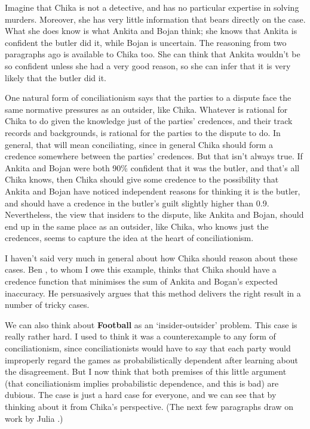 Imagine that \gls{Chika} is not a detective, and has no particular expertise in solving murders. Moreover, she has very little information that bears directly on the case. What she does know is what \gls{Ankita} and \gls{Bojan} think; she knows that \gls{Ankita} is confident the butler did it, while \gls{Bojan} is uncertain. The reasoning from two paragraphs ago is available to \gls{Chika} too. She can think that \gls{Ankita} wouldn't be so confident unless she had a very good reason, so she can infer that it is very likely that the butler did it.

One natural form of conciliationism says that the parties to a dispute face the same normative pressures as an outsider, like \gls{Chika}. Whatever is rational for \gls{Chika} to do given the knowledge just of the parties' credences, and their track records and backgrounds, is rational for the parties to the dispute to do. In general, that will mean conciliating, since in general \gls{Chika} should form a credence somewhere between the parties' credences. But that isn't always true. If \gls{Ankita} and \gls{Bojan} were both 90\% confident that it was the butler, and that's all \gls{Chika} knows, then \gls{Chika} should give some credence to the possibility that \gls{Ankita} and \gls{Bojan} have noticed independent reasons for thinking it is the butler, and should have a credence in the butler's guilt slightly higher than 0.9. Nevertheless, the view that insiders to the dispute, like \gls{Ankita} and \gls{Bojan}, should end up in the same place as an outsider, like \gls{Chika}, who knows just the credences, seems to capture the idea at the heart of conciliationism.

I haven't said very much in general about how \gls{Chika} should reason about these cases. Ben \citet{Levinstein2013}, to whom I owe this example, thinks that \gls{Chika} should have a credence function that minimises the sum of \gls{Ankita} and Bogan's expected inaccuracy. He persuasively argues that this method delivers the right result in a number of tricky cases.

We can also think about \textbf{Football} as an `insider-outsider' problem. This case is really rather hard. I used to think it was a counterexample to any form of conciliationism, since conciliationists would have to say that each party would improperly regard the games as probabilistically dependent after learning about the disagreement. But I now think that both premises of this little argument (that conciliationism implies probabilistic dependence, and this is bad) are dubious. The case is just a hard case for everyone, and we can see that by thinking about it from \gls{Chika}'s perspective. (The next few paragraphs draw on work by Julia \citet{Staffel2015}.)

